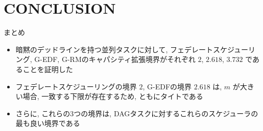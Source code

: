 
\section{CONCLUSION}
\label{sec: conclusion}

\begin{frame}{まとめ}
    \begin{itemize}
        \item 暗黙のデッドラインを持つ並列タスクに対して, フェデレートスケジューリング, G-EDF, G-RMのキャパシティ拡張境界がそれぞれ $2$, $2.618$, $3.732$ であることを証明した
        \item フェデレートスケジューリングの境界 $2$, G-EDFの境界 $2.618$ は, $m$ が大きい場合, 一致する下限が存在するため, ともにタイトである
        \item さらに, これらの3つの境界は, DAGタスクに対するこれらのスケジューラの最も良い境界である
    \end{itemize}
\end{frame}

